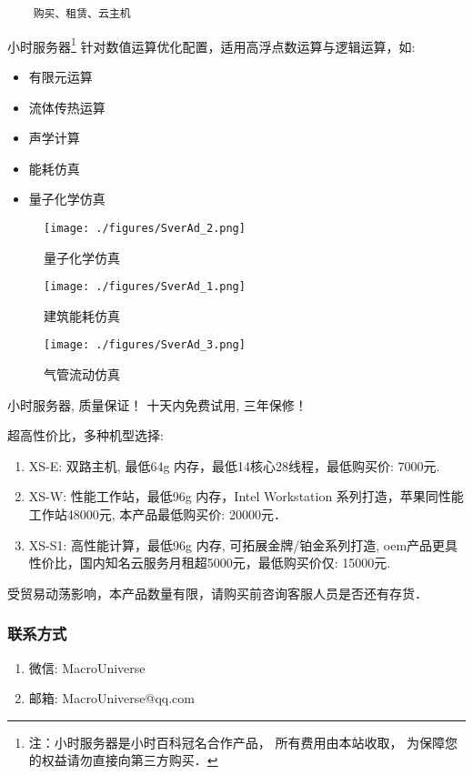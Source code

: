 

\begin{lstlisting}
    购买、租赁、云主机
\end{lstlisting}

小时服务器\footnote{注：小时服务器是小时百科冠名合作产品， 所有费用由本站收取， 为保障您的权益请勿直接向第三方购买．} 针对数值运算优化配置，适用高浮点数运算与逻辑运算，如:
\begin{itemize}
\item 有限元运算
\item 流体传热运算
\item 声学计算
\item 能耗仿真
\item 量子化学仿真
\end{itemize}
\begin{figure}[ht]
\centering
\texttt{[image: ./figures/SverAd\_2.png]}
\caption{量子化学仿真} \label{SverAd_fig2}
\end{figure}
\begin{figure}[ht]
\centering
\texttt{[image: ./figures/SverAd\_1.png]}
\caption{建筑能耗仿真} \label{SverAd_fig1}
\end{figure}
\begin{figure}[ht]
\centering
\texttt{[image: ./figures/SverAd\_3.png]}
\caption{气管流动仿真} \label{SverAd_fig3}
\end{figure}

小时服务器, 质量保证！ 十天内免费试用, 三年保修！

超高性价比，多种机型选择:
\begin{enumerate}
\item XS-E: 双路主机, 最低64g 内存，最低14核心28线程，最低购买价: 7000元.
\item XS-W: 性能工作站，最低96g 内存，Intel Workstation 系列打造，苹果同性能工作站48000元, 本产品最低购买价: 20000元．
\item XS-S1: 高性能计算，最低96g 内存, 可拓展金牌/铂金系列打造, oem产品更具性价比，国内知名云服务月租超5000元，最低购买价仅: 15000元.

\end{enumerate}

受贸易动荡影响，本产品数量有限，请购买前咨询客服人员是否还有存货．
\subsubsection{联系方式}
\begin{enumerate}
\item 微信: MacroUniverse
\item 邮箱: MacroUniverse@qq.com
\end{enumerate}


